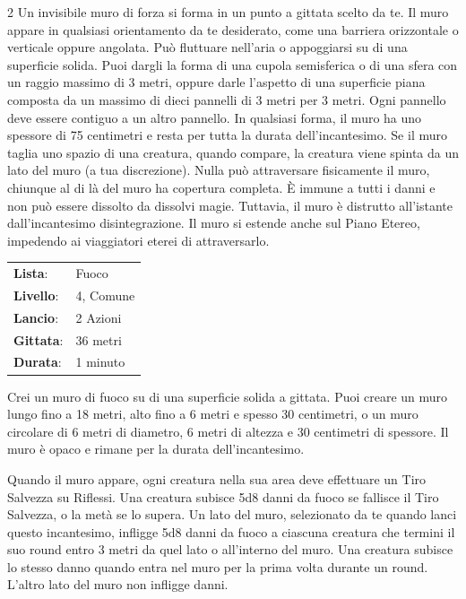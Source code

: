 \begin{multicols}{2}
Un invisibile muro di forza si forma in un punto a gittata scelto da te. Il muro appare in qualsiasi orientamento da te desiderato, come una barriera orizzontale o verticale oppure angolata. Può fluttuare nell'aria o appoggiarsi su di una superficie solida. Puoi dargli la forma di una cupola semisferica o di una sfera con un raggio massimo di 3 metri, oppure darle l'aspetto di una superficie piana composta da un massimo di dieci pannelli di 3 metri per 3 metri. Ogni pannello deve essere contiguo a un altro pannello. In qualsiasi forma, il muro ha uno spessore di 75 centimetri e resta per tutta la durata dell'incantesimo. Se il muro taglia uno spazio di una creatura, quando compare, la creatura viene spinta da un lato del muro (a tua discrezione). Nulla può attraversare fisicamente il muro, chiunque al di là del muro ha copertura completa. È immune a tutti i danni e non può essere dissolto da dissolvi magie. Tuttavia, il muro è distrutto all'istante dall'incantesimo disintegrazione. Il muro si estende anche sul Piano Etereo, impedendo ai viaggiatori eterei di attraversarlo.

\noindent\begin{tabularx}{\linewidth}{p{1.9cm}X}
	\rowcolor{gray!20}\textbf{Lista}: & Fuoco \\
	\textbf{Livello}: & 4, Comune \\
	\rowcolor{gray!20}\textbf{Lancio}: & 2 Azioni \\
	\textbf{Gittata}: & 36 metri \\
	\rowcolor{gray!20}\textbf{Durata}: & 1 minuto \\
\end{tabularx}\smallskip

Crei un muro di fuoco su di una superficie solida a gittata. Puoi creare un muro lungo fino a 18 metri, alto fino a 6 metri e spesso 30 centimetri, o un muro circolare di 6 metri di diametro, 6 metri di altezza e 30 centimetri di spessore. Il muro è opaco e rimane per la durata dell'incantesimo.

Quando il muro appare, ogni creatura nella sua area deve effettuare un Tiro Salvezza su Riflessi. Una creatura subisce 5d8 danni da fuoco se fallisce il Tiro Salvezza, o la metà se lo supera. Un lato del muro, selezionato da te quando lanci questo incantesimo, infligge 5d8 danni da fuoco a ciascuna creatura che termini il suo round entro 3 metri da quel lato o all'interno del muro. Una creatura subisce lo stesso danno quando entra nel muro per la prima volta durante un round. L'altro lato del muro non infligge danni.


\end{multicols}
